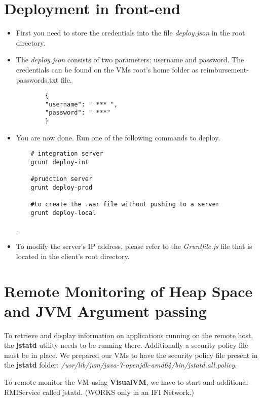 \section{Deployment in front-end}
\label{deployment:frontend}
\begin{itemize}
	\item First you need to store the credentials into the file \textit{deploy.json} in the root directory.
	\item The \textit{deploy.json} consists of two parameters: username and password. The credentials can be found on the VMs root's home folder as reimbursement-passwords.txt file.
	\begin{lstlisting}
		{
		"username": " *** ",
		"password": " ***"
		}	\end{lstlisting}
	\item You are now done. Run one of the following commands to deploy.
	\begin{lstlisting}
	# integration server
	grunt deploy-int 
	
	#prudction server
	grunt deploy-prod
	
	#to create the .war file without pushing to a server
	grunt deploy-local	\end{lstlisting}.
	\item To modify the server's IP address, please refer to the \textit{Gruntfile.js} file that is located in the client's root directory.
\end{itemize}


\section{Remote Monitoring of Heap Space and JVM Argument passing}
\label{appendix:visualvm}
To retrieve and display information on applications running on the remote host, the \textbf{jstatd} utility needs to be running there. Additionally a security policy file must be in place. We prepared our VMs to have the security policy file present in the \textbf{jstatd} folder:  \textit{/usr/lib/jvm/java-7-openjdk-amd64/bin/jstatd.all.policy}.\par

To remote monitor the VM using \textbf{VisualVM}, we have to start and additional RMIService called jstatd. (WORKS only in an IFI Network.)

